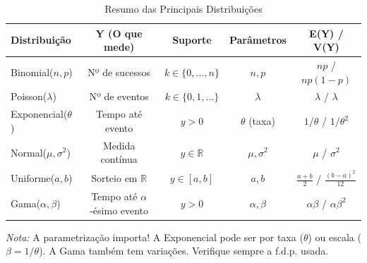 \begin{table}[h]
\centering
\caption{Resumo das Principais Distribuições}
\begin{tabular}{@{}lcccc@{}}
\toprule
\textbf{Distribuição} & \textbf{Y (O que mede)} & \textbf{Suporte} & \textbf{Parâmetros} & \textbf{E(Y) / V(Y)} \\ \midrule
Binomial($n, p$) & Nº de sucessos & $k \in \{0, ..., n\}$ & $n, p$ & $np$ / $np(1-p)$ \\
Poisson($\lambda$) & Nº de eventos & $k \in \{0, 1, ...\}$ & $\lambda$ & $\lambda$ / $\lambda$ \\
Exponencial($\theta$) & Tempo até evento & $y > 0$ & $\theta$ (taxa) & $1/\theta$ / $1/\theta^2$ \\
Normal($\mu, \sigma^2$) & Medida contínua & $y \in \mathbb{R}$ & $\mu, \sigma^2$ & $\mu$ / $\sigma^2$ \\
Uniforme($a, b$) & Sorteio em $\mathbb{R}$ & $y \in [a, b]$ & $a, b$ & $\frac{a+b}{2}$ / $\frac{(b-a)^2}{12}$ \\
Gama($\alpha, \beta$) & Tempo até $\alpha$-ésimo evento & $y > 0$ & $\alpha, \beta$ & $\alpha\beta$ / $\alpha\beta^2$ \\ \bottomrule
\end{tabular}
\label{tab:dist_summary}
\end{table}

\noindent \textit{Nota:} A parametrização importa! A Exponencial pode ser por taxa ($\theta$) ou escala ($\beta=1/\theta$). A Gama também tem variações. Verifique sempre a f.d.p. usada.

